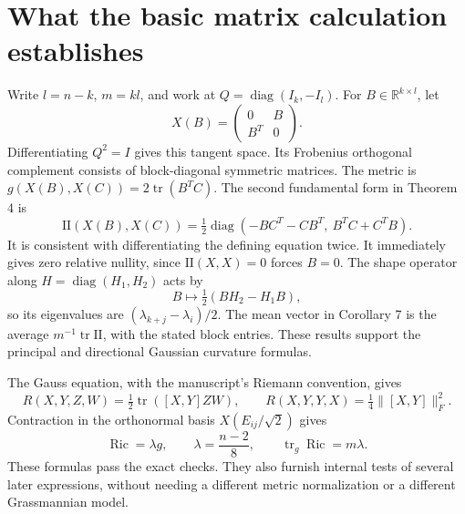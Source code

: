 \documentclass[10pt]{article}
\begin{document}
\section*{What the basic matrix calculation establishes}
Write \(l=n-k\), \(m=kl\), and work at \(Q=\operatorname{diag}(I_k,-I_l)\). For \(B\in\mathbb R^{k\times l}\), let \[X(B)=\begin{pmatrix}0&B\\B^T&0\end{pmatrix}.\] Differentiating \(Q^2=I\) gives this tangent space. Its Frobenius orthogonal complement consists of block-diagonal symmetric matrices. The metric is \(g(X(B),X(C))=2\mathop{\mathrm{tr}}(B^TC)\). The second fundamental form in Theorem 4 is \[\mathrm{II}(X(B),X(C))
 =\tfrac12\operatorname{diag}(-BC^T-CB^T,\ B^TC+C^TB).\] It is consistent with differentiating the defining equation twice. It immediately gives zero relative nullity, since \(\mathrm{II}(X,X)=0\) forces \(B=0\). The shape operator along \(H=\operatorname{diag}(H_1,H_2)\) acts by \[B\longmapsto\tfrac12(BH_2-H_1B),\] so its eigenvalues are \((\lambda_{k+j}-\lambda_i)/2\). The mean vector in Corollary 7 is the average \(m^{-1}\mathop{\mathrm{tr}}\mathrm{II}\), with the stated block entries. These results support the principal and directional Gaussian curvature formulas.\par
The Gauss equation, with the manuscript’s Riemann convention, gives \[R(X,Y,Z,W)=\tfrac12\mathop{\mathrm{tr}}([X,Y]ZW),\qquad
 R(X,Y,Y,X)=\tfrac14\|[X,Y]\|_F^2.\] Contraction in the orthonormal basis \(X(E_{ij}/\sqrt2)\) gives \[\mathop{\mathrm{Ric}}=\lambda g,\qquad \lambda=\frac{n-2}{8},\qquad
 \mathop{\mathrm{tr}}_g\mathop{\mathrm{Ric}}=m\lambda.\] These formulas pass the exact checks. They also furnish internal tests of several later expressions, without needing a different metric normalization or a different Grassmannian model.\par
\end{document}
